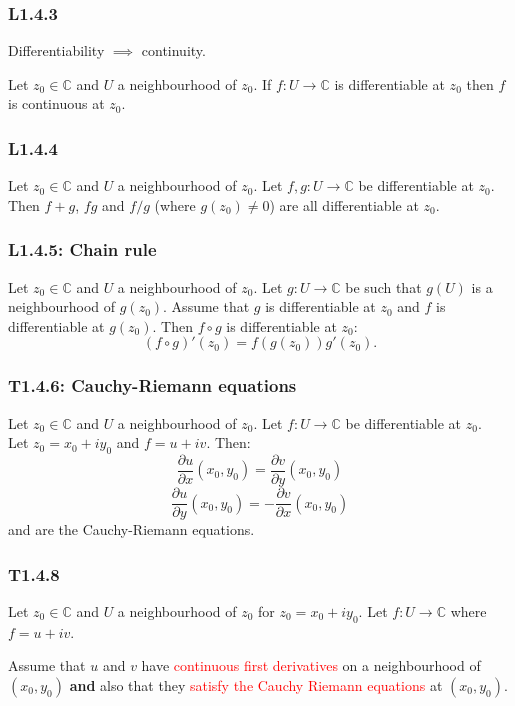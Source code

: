 \documentclass{article}
\begin{document}
\begin{multicols*}{3}
\subsubsection*{L1.4.3}
Differentiability $\implies$ continuity.

Let $z_0\in\mathbb{C}$ and $U$ a neighbourhood of $z_0$.
If $f:U\rightarrow\mathbb{C}$ is differentiable at $z_0$ then
$f$ is continuous at $z_0$.

\subsubsection*{L1.4.4}
Let $z_0\in\mathbb{C}$ and $U$ a neighbourhood of $z_0$.
Let $f,g:U\rightarrow\mathbb{C}$ be differentiable at $z_0$.
Then $f+g$, $fg$ and $f/g$ (where $g(z_0)\neq0$)
are all differentiable at $z_0$.

\subsubsection*{L1.4.5: Chain rule}
Let $z_0\in\mathbb{C}$ and $U$ a neighbourhood of $z_0$.
Let $g:U\rightarrow\mathbb{C}$ be such that $g(U)$ is a neighbourhood
of $g(z_0)$. Assume that $g$ is differentiable at $z_0$
and $f$ is differentiable at $g(z_0)$. Then $f\circ g$
is differentiable at $z_0$:
$$(f\circ g)'(z_0)=f(g(z_0))g'(z_0).$$

\subsubsection*{T1.4.6: Cauchy-Riemann equations}
Let $z_0\in\mathbb{C}$ and $U$ a neighbourhood of $z_0$.
Let $f:U\rightarrow\mathbb{C}$ be differentiable at $z_0$. \\
Let $z_0=x_0+i y_0$ and $f=u+iv$. Then:
$$\frac{\partial u}{\partial x}(x_0,y_0)
=\frac{\partial v}{\partial y}(x_0,y_0)$$
$$\frac{\partial u}{\partial y}(x_0,y_0)
=-\frac{\partial v}{\partial x}(x_0,y_0)$$
and are the Cauchy-Riemann equations.

\subsubsection*{T1.4.8}
Let $z_0\in\mathbb{C}$ and $U$ a neighbourhood of $z_0$
for $z_0=x_0+i y_0$. Let $f:U\rightarrow\mathbb{C}$ where $f=u+iv$.

Assume that $u$ and $v$ have
\textcolor{red}{continuous first derivatives}
on a neighbourhood of $(x_0,y_0)$ \textbf{and} also that they
\textcolor{red}{satisfy the Cauchy Riemann equations}
at $(x_0,y_0)$.


\end{multicols*}
\end{document}
